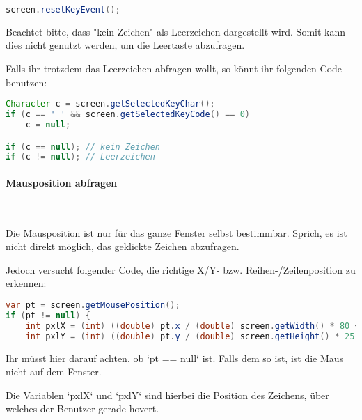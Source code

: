 \documentclass[12pt,a4paper]{article}
\begin{document}
\begin{tcolorbox}[frame empty,nobeforeafter,colback=gray!5]
\begin{lstlisting}[language=java,basicstyle=\ttfamily]
screen.resetKeyEvent();
\end{lstlisting}
\end{tcolorbox}

Beachtet bitte, dass "kein Zeichen" als Leerzeichen dargestellt wird. Somit kann dies nicht genutzt werden, um die Leertaste abzufragen.

Falls ihr trotzdem das Leerzeichen abfragen wollt, so könnt ihr folgenden Code benutzen:

\begin{tcolorbox}[frame empty,nobeforeafter,colback=gray!5]
\begin{lstlisting}[language=java,basicstyle=\ttfamily]
Character c = screen.getSelectedKeyChar();
if (c == ' ' && screen.getSelectedKeyCode() == 0)
    c = null;

if (c == null); // kein Zeichen
if (c != null); // Leerzeichen
\end{lstlisting}
\end{tcolorbox}

\paragraph{Mausposition abfragen}\

Die Mausposition ist nur für das ganze Fenster selbst bestimmbar. Sprich, es ist nicht direkt möglich, das geklickte Zeichen abzufragen.

Jedoch versucht folgender Code, die richtige X/Y- bzw. Reihen-/Zeilenposition zu erkennen:

\begin{tcolorbox}[frame empty,nobeforeafter,colback=gray!5]
\begin{lstlisting}[language=java,basicstyle=\ttfamily]
var pt = screen.getMousePosition();
if (pt != null) {
    int pxlX = (int) ((double) pt.x / (double) screen.getWidth() * 80 + .5d);
    int pxlY = (int) ((double) pt.y / (double) screen.getHeight() * 25 - .5d);
\end{lstlisting}
\end{tcolorbox}

Ihr müsst hier darauf achten, ob `pt == null` ist. Falls dem so ist, ist die Maus nicht auf dem Fenster.

Die Variablen `pxlX` und `pxlY` sind hierbei die Position des Zeichens, über welches der Benutzer gerade hovert.
\end{document}
